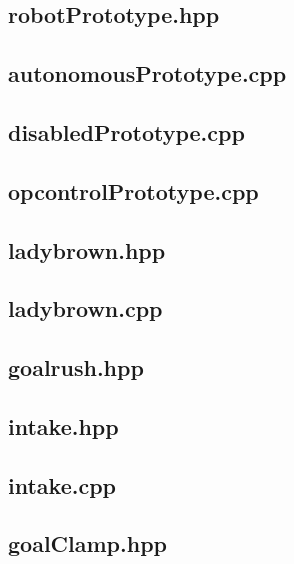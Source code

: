 \subsection{robotPrototype.hpp}

\subsection{autonomousPrototype.cpp}

\subsection{disabledPrototype.cpp}

\subsection{opcontrolPrototype.cpp}

\subsection{ladybrown.hpp}

\subsection{ladybrown.cpp}

\subsection{goalrush.hpp}

\subsection{intake.hpp}

\subsection{intake.cpp}

\subsection{goalClamp.hpp}

